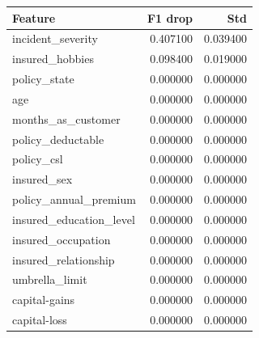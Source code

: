 \begin{tabular}{lrr}
\toprule
Feature & F1 drop & Std \\
\midrule
incident\_severity & 0.407100 & 0.039400 \\
insured\_hobbies & 0.098400 & 0.019000 \\
policy\_state & 0.000000 & 0.000000 \\
age & 0.000000 & 0.000000 \\
months\_as\_customer & 0.000000 & 0.000000 \\
policy\_deductable & 0.000000 & 0.000000 \\
policy\_csl & 0.000000 & 0.000000 \\
insured\_sex & 0.000000 & 0.000000 \\
policy\_annual\_premium & 0.000000 & 0.000000 \\
insured\_education\_level & 0.000000 & 0.000000 \\
insured\_occupation & 0.000000 & 0.000000 \\
insured\_relationship & 0.000000 & 0.000000 \\
umbrella\_limit & 0.000000 & 0.000000 \\
capital-gains & 0.000000 & 0.000000 \\
capital-loss & 0.000000 & 0.000000 \\
\bottomrule
\end{tabular}
